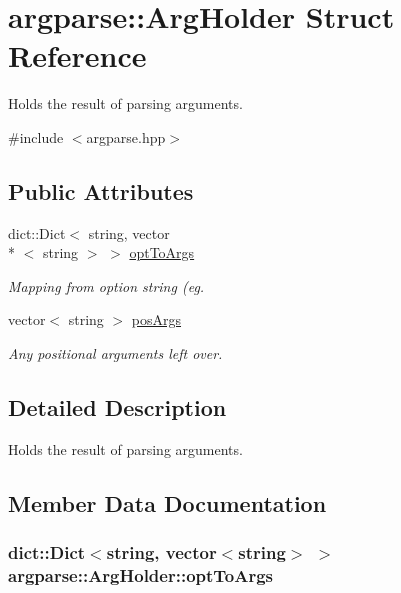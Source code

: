 \hypertarget{structargparse_1_1_arg_holder}{\section{argparse\-:\-:Arg\-Holder Struct Reference}
\label{structargparse_1_1_arg_holder}
}


Holds the result of parsing arguments.  




{\ttfamily \#include $<$argparse.\-hpp$>$}

\subsection*{Public Attributes}
\begin{DoxyCompactItemize}
\item 
dict\-::\-Dict$<$ string, vector\\*
$<$ string $>$ $>$ \hyperlink{structargparse_1_1_arg_holder_a47515881e73e90ca90adebc128305cdb}{opt\-To\-Args}
\begin{DoxyCompactList}\small\item\em Mapping from option string (eg. \end{DoxyCompactList}\item 
vector$<$ string $>$ \hyperlink{structargparse_1_1_arg_holder_a3154d09426a4270992d6b54cc1eb2927}{pos\-Args}
\begin{DoxyCompactList}\small\item\em Any positional arguments left over. \end{DoxyCompactList}\end{DoxyCompactItemize}


\subsection{Detailed Description}
Holds the result of parsing arguments. 



\subsection{Member Data Documentation}
\hypertarget{structargparse_1_1_arg_holder_a47515881e73e90ca90adebc128305cdb}{
\subsubsection[{opt\-To\-Args}]{\setlength{\rightskip}{0pt plus 5cm}dict\-::\-Dict$<$string, vector$<$string$>$ $>$ {\bf argparse\-::\-Arg\-Holder\-::opt\-To\-Args}}}\label{structargparse_1_1_arg_holder_a47515881e73e90ca90adebc128305cdb}


